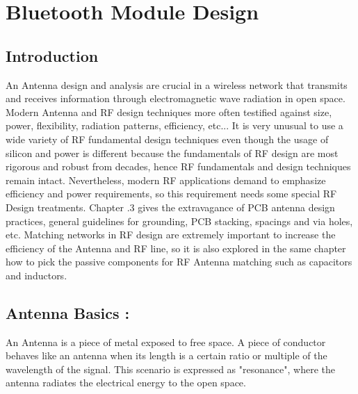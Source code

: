 
\chapter{Bluetooth Module Design}\label{chap:BLE}

\section{Introduction}


An Antenna design and analysis are crucial in a wireless network that transmits and receives information through electromagnetic wave radiation in open space.
Modern Antenna and RF design techniques more often testified against size, power, flexibility, radiation patterns, efficiency, etc...
It is very unusual to use a wide variety of RF fundamental design techniques even though the usage of silicon and power is different because the fundamentals of RF design are most rigorous and robust from decades, hence RF fundamentals and design techniques remain intact. Nevertheless, modern RF applications demand to emphasize efficiency and power requirements, so this requirement needs some special RF Design treatments.
Chapter .3 gives the extravagance of PCB antenna design practices, general guidelines for grounding, PCB stacking, spacings and via holes, etc. Matching networks in RF design are extremely important to increase the efficiency of the Antenna and RF line, so it is also explored in the same chapter how to pick the passive components for RF Antenna matching such as capacitors and inductors.

\section{Antenna Basics :}

An Antenna is a piece of metal exposed to free space. A piece of conductor behaves like an antenna when its length is a certain ratio or multiple of the wavelength of the signal. This scenario is expressed as "resonance", where the antenna radiates the electrical energy to the open space.




